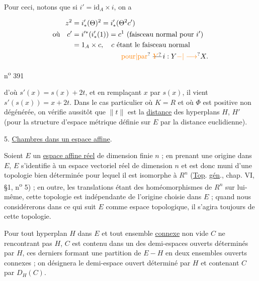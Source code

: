 Pour ceci, notons que si $i'=\mathrm{id}_A\times i$, on a


\[
\begin{aligned}
z^2&=i'_*(\Theta)^2=i'_*(\Theta^2c')\\
\text{où}\quad c'&=i'^{*}(i'_*(1))=c^1\ (\text{faisceau normal pour }i')\\
&=1_A\times c,\quad c\ \text{étant le faisceau normal}\\
&\hspace{7em}\text{\unsure{pour|par} }\deleted{\unsure{Y}}\,i:Y\unsure{-|\longrightarrow} X.
\end{aligned}
\]


n\textsuperscript{o} 391

d'où $s'(x)=s(x)+2t$, et en remplaçant $x$ par $s(x)$, il vient $s'(s(x))=x+2t$.
Dans le cas particulier où $K=R$ et où $\Phi$ est positive non dégénérée, on vérifie aussitôt que $\lVert t\rVert$ est la \uline{distance} des hyperplans $H$, $H'$ (pour la structure d'espace métrique définie sur $E$ par la distance euclidienne).

5. \uline{Chambres dans un espace affine}.

Soient $E$ un \uline{espace affine réel} de dimension finie $n$ ; en prenant une origine dans $E$, $E$ s'identifie à un espace vectoriel réel de dimension $n$ et est donc muni d'une topologie bien déterminée pour lequel il est isomorphe à $R^n$ (\uline{Top}. \uline{gén}., chap. VI, §1, n\textsuperscript{o} 5) ; en outre, les translations étant des homéomorphismes de $R^n$ sur lui-même, cette topologie est indépendante de l'origine choisie dans $E$ ; quand nous considérerons dans ce qui suit $E$ comme espace topologique, il s'agira toujours de cette topologie.

Pour tout hyperplan $H$ dans $E$ et tout ensemble \uline{connexe} non vide $C$ ne rencontrant pas $H$, $C$ est contenu dans un des demi-espaces ouverts déterminés par $H$, ces derniers formant une partition de $E-H$ en deux ensembles ouverts connexes ; on désignera le demi-espace ouvert déterminé par $H$ et contenant $C$ par $D_H(C)$.

